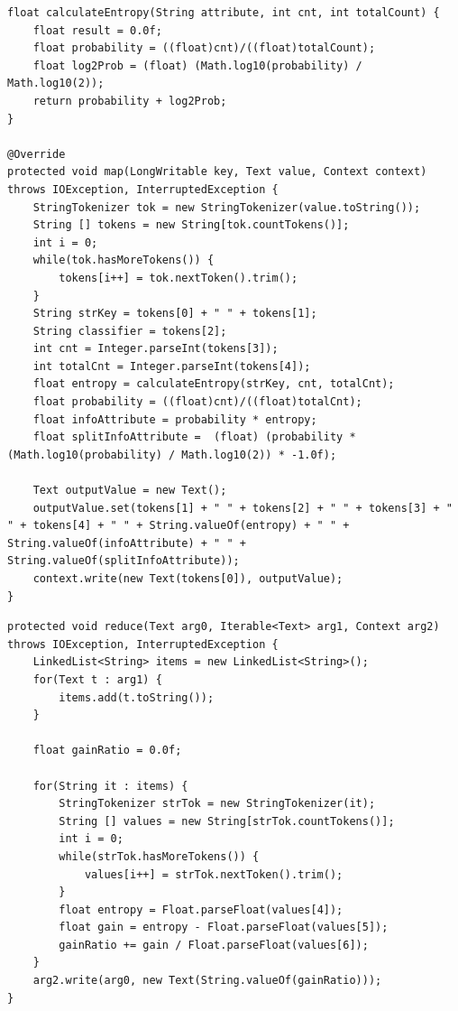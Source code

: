 \documentclass{article}
\begin{document}
\begin{lstlisting}[caption={Attrib Selection Mapper code snippet},label={lst:attrselmap},style=MyJavaStyle]
float calculateEntropy(String attribute, int cnt, int totalCount) {
    float result = 0.0f;
    float probability = ((float)cnt)/((float)totalCount);
    float log2Prob = (float) (Math.log10(probability) / Math.log10(2));
    return probability + log2Prob;
}

@Override
protected void map(LongWritable key, Text value, Context context)
throws IOException, InterruptedException {
    StringTokenizer tok = new StringTokenizer(value.toString());
    String [] tokens = new String[tok.countTokens()];
    int i = 0;
    while(tok.hasMoreTokens()) {
        tokens[i++] = tok.nextToken().trim();
    }
    String strKey = tokens[0] + " " + tokens[1];
    String classifier = tokens[2];
    int cnt = Integer.parseInt(tokens[3]);
    int totalCnt = Integer.parseInt(tokens[4]);
    float entropy = calculateEntropy(strKey, cnt, totalCnt);
    float probability = ((float)cnt)/((float)totalCnt);
    float infoAttribute = probability * entropy;
    float splitInfoAttribute =  (float) (probability * (Math.log10(probability) / Math.log10(2)) * -1.0f);

    Text outputValue = new Text();
    outputValue.set(tokens[1] + " " + tokens[2] + " " + tokens[3] + " " + tokens[4] + " " + String.valueOf(entropy) + " " + String.valueOf(infoAttribute) + " " + String.valueOf(splitInfoAttribute));
    context.write(new Text(tokens[0]), outputValue);
}
\end{lstlisting}

\begin{lstlisting}[caption={Attrib Selection Reducer code snippet},label={lst:attrselred},style=MyJavaStyle]
protected void reduce(Text arg0, Iterable<Text> arg1, Context arg2)
throws IOException, InterruptedException {
    LinkedList<String> items = new LinkedList<String>();
    for(Text t : arg1) {
        items.add(t.toString());
    }

    float gainRatio = 0.0f;

    for(String it : items) {
        StringTokenizer strTok = new StringTokenizer(it);
        String [] values = new String[strTok.countTokens()];
        int i = 0;
        while(strTok.hasMoreTokens()) {
            values[i++] = strTok.nextToken().trim();
        }
        float entropy = Float.parseFloat(values[4]);
        float gain = entropy - Float.parseFloat(values[5]);
        gainRatio += gain / Float.parseFloat(values[6]);
    }
    arg2.write(arg0, new Text(String.valueOf(gainRatio)));
}
\end{lstlisting}
\end{document}
